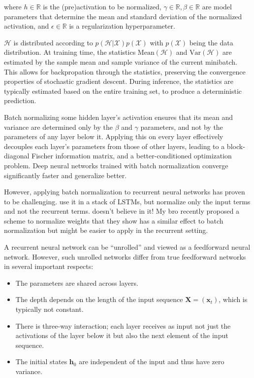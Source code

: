 \documentclass{article} %
\newcommand{\vect}[1]{\mathbf{#1}}
\newcommand{\mat}[1]{\mathbf{#1}}
\newcommand{\reals}{\mathbb{R}}
\begin{document}
where $h \in \reals$ is the (pre)activation to be normalized, $\gamma \in \reals, \beta \in \reals$ are model parameters that determine the mean and standard deviation of the normalized activation, and $\epsilon \in \reals$ is a regularization hyperparameter.

$\mathcal{H}$ is distributed according to $p(\mathcal{H}|\mathcal{X}) p(\mathcal{X})$ with $p(\mathcal{X})$ being the data distribution.
At training time, the statistics $\mathrm{Mean}(\mathcal{H})$ and $\mathrm{Var}(\mathcal{H})$ are estimated by the sample mean and sample variance of the current minibatch.
This allows for backpropation through the statistics, preserving the convergence properties of stochastic gradient descent.
During inference, the statistics are typically estimated based on the entire training set, to produce a deterministic prediction.

Batch normalizing some hidden layer's activation ensures that its mean and variance are determined only by the $\beta$ and $\gamma$ parameters, and not by the parameters of any layer below it.
Applying this on every layer effectively decouples each layer's parameters from those of other layers, leading to a block-diagonal Fischer information matrix, and a better-conditioned optimization problem.
Deep neural networks trained with batch normalization converge significantly faster and generalize better.

However, applying batch normalization to recurrent neural networks has proven to be challenging.
\cite{Baidu} use it in a stack of LSTMs, but normalize only the input terms and not the recurrent terms.
\cite{Cesar} doesn't believe in it!
My bro \cite{Tim Salimans} recently proposed a scheme to normalize weights that they show has a similar effect to batch normalization but might be easier to apply in the recurrent setting.

A recurrent neural network can be ``unrolled'' and viewed as a feedforward neural network.
However, such unrolled networks differ from true feedforward networks in several important respects:
\begin{itemize}
\item The parameters are shared across layers.
\item The depth depends on the length of the input sequence $\mat{X} = (\vect{x}_t)$, which is typically not constant.
\item There is three-way interaction; each layer receives as input not just the activations of the layer below it but also the next element of the input sequence.
\item The initial states $\vect{h}_0$ are independent of the input and thus have zero variance.
\end{itemize}
\end{document}
